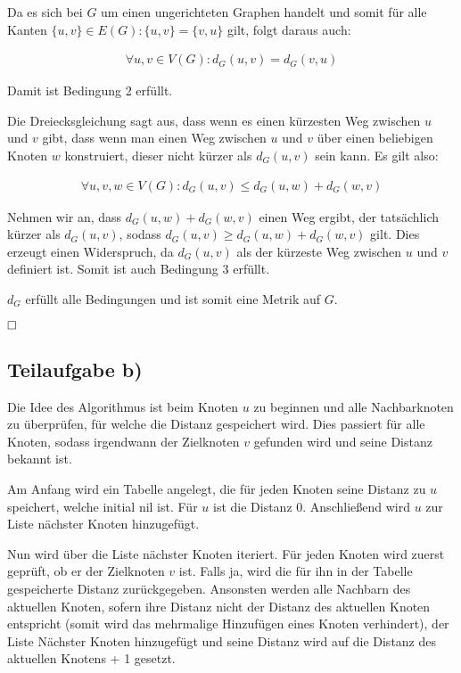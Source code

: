 \documentclass[12pt]{scrartcl}%
\theoremstyle{nonumberplain}
\begin{document}
Da es sich bei $G$ um einen ungerichteten Graphen handelt und somit für alle Kanten $\{u,v\} \in E(G): \{u,v\} = \{v,u\}$ gilt, folgt daraus auch:

\begin{align*}
	\forall u,v \in V(G): d_G(u,v) = d_G(v,u)
\end{align*}

Damit ist Bedingung 2 erfüllt.

Die Dreiecksgleichung sagt aus, dass wenn es einen kürzesten Weg zwischen $u$ und $v$ gibt, dass wenn man einen Weg zwischen $u$ und $v$ über einen beliebigen Knoten $w$ konstruiert, dieser nicht kürzer als $d_G(u,v)$ sein kann. Es gilt also:

\begin{align*}
	\forall u,v,w \in V(G): d_G(u,v) \le d_G(u,w) + d_G(w,v)
\end{align*}

Nehmen wir an, dass $d_G(u,w) + d_G(w,v)$ einen Weg ergibt, der tatsächlich kürzer als $d_G(u,v)$, sodass $d_G(u,v) \ge d_G(u,w) + d_G(w,v)$ gilt. Dies erzeugt einen Widerspruch, da $d_G(u,v)$ als der kürzeste Weg zwischen $u$ und $v$ definiert ist. Somit ist auch Bedingung 3 erfüllt.

$d_G$ erfüllt alle Bedingungen und ist somit eine Metrik auf $G$.

$\hfill \square$

\subsection*{Teilaufgabe b)}

Die Idee des Algorithmus ist beim Knoten $u$ zu beginnen und alle Nachbarknoten zu überprüfen, für welche die Distanz gespeichert wird. Dies passiert für alle Knoten, sodass irgendwann der Zielknoten $v$ gefunden wird und seine Distanz bekannt ist.

Am Anfang wird ein Tabelle angelegt, die für jeden Knoten seine Distanz zu $u$ speichert, welche initial nil ist. Für $u$ ist die Distanz 0. Anschließend wird $u$ zur Liste nächster Knoten hinzugefügt. 

Nun wird über die Liste nächster Knoten iteriert. Für jeden Knoten wird zuerst geprüft, ob er der Zielknoten $v$ ist. Falls ja, wird die für ihn in der Tabelle gespeicherte Distanz zurückgegeben. Ansonsten werden alle Nachbarn des aktuellen Knoten, sofern ihre Distanz nicht der Distanz des aktuellen Knoten entspricht (somit wird das mehrmalige Hinzufügen eines Knoten verhindert), der Liste Nächster Knoten hinzugefügt und seine Distanz wird auf die Distanz des aktuellen Knotens + 1 gesetzt.
\end{document}
